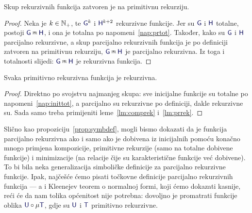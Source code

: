 \begin{lema}\label{lm:prrek}
Skup rekurzivnih funkcija zatvoren je na primitivnu rekurziju.
\end{lema}
\begin{proof}
Neka je $k\in{\mathbb N}_+$, te $\f G^k$ i $\f H^{k+2}$ rekurzivne funkcije. Jer su $\f G$ i $\f H$ totalne, postoji $\f G\pr\f H$, i ona je totalna po napomeni~\ref{nap:prtot}. Također, kako su $\f G$ i $\f H$ parcijalno rekurzivne, a skup parcijalno rekurzivnih funkcija je po definiciji zatvoren na primitivnu rekurziju, $\f G\pr\f H$ je parcijalno rekurzivna. Iz toga i totalnosti slijedi: $\f G\pr\f H$ je rekurzivna funkcija.
\end{proof}

\begin{korolar}\label{kor:prnrek}
Svaka primitivno rekurzivna funkcija je rekurzivna.
\end{korolar}
\begin{proof}
Direktno po svojstvu najmanjeg skupa: sve inicijalne funkcije su totalne po napomeni~\ref{nap:inittot}, a parcijalno su rekurzivne po definiciji, dakle rekurzivne su. Sada samo treba primijeniti leme~\ref{lm:comprek} i~\ref{lm:prrek}.
\end{proof}

Slično kao propoziciju~\ref{prop:symbdef}, mogli bismo dokazati da je funkcija parcijalno rekurzivna ako i samo ako je dobivena iz inicijalnih pomoću konačno mnogo primjena kompozicije, primitivne rekurzije (samo na totalne dobivene funkcije) i minimizacije (na relacije čije su karakteristične funkcije već dobivene). To bi bila neka generalizacija simboličke definicije za parcijalno rekurzivne funkcije. Ipak, najčešće ćemo pisati točkovne definicije parcijalno rekurzivnih funkcija --- a i Kleenejev teorem o normalnoj formi, koji ćemo dokazati kasnije, reći će da nam tolika općenitost nije potrebna: dovoljno je promatrati funkcije oblika $\f U\circ\mu\f T$, gdje su $\f U$ i $\f T$ primitivno rekurzivne.



